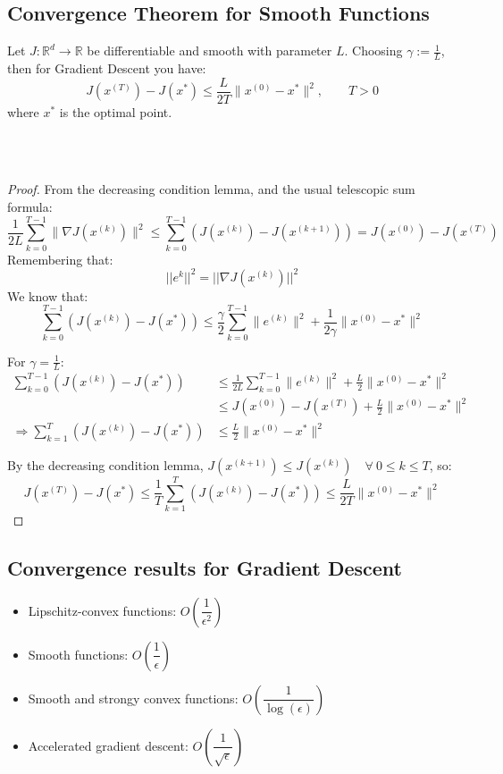 \subsection{Convergence Theorem for Smooth Functions}
\begin{theorem}
Let $J: \mathbb{R}^d \to \mathbb{R}$ be differentiable and smooth with parameter $L$.
Choosing $\gamma := \frac{1}{L}$, then for Gradient Descent you have:
\[
J(x^{(T)}) - J(x^*) \leq \frac{L}{2T}\|x^{(0)} - x^*\|^2, \quad \quad  T > 0
\]
where $x^*$ is the optimal point.
\end{theorem}
\\ \\
\begin{proof}
From the decreasing condition lemma, and the usual telescopic sum formula:
\[
\frac{1}{2L}\sum_{k=0}^{T-1}\|\nabla J(x^{(k)})\|^2 \leq \sum_{k=0}^{T-1}(J(x^{(k)}) - J(x^{(k+1)})) = J(x^{(0)}) - J(x^{(T)})
\]
Remembering that:
$$
|| e^{k} ||^2 = || \nabla J(x^{(k)}) ||^2
$$
We know that:
\[
\sum_{k=0}^{T-1}(J(x^{(k)}) - J(x^*)) \leq \frac{\gamma}{2}\sum_{k=0}^{T-1}\|e^{(k)}\|^2 + \frac{1}{2\gamma}\|x^{(0)} - x^*\|^2
\]

For $\gamma = \frac{1}{L}$:
\begin{align*}
\sum_{k=0}^{T-1}(J(x^{(k)}) - J(x^*)) &\leq \frac{1}{2L}\sum_{k=0}^{T-1}\|e^{(k)}\|^2 + \frac{L}{2}\|x^{(0)} - x^*\|^2 \\
&\leq J(x^{(0)}) - J(x^{(T)}) + \frac{L}{2}\|x^{(0)} - x^*\|^2 \\
\Rightarrow \sum_{k=1}^{T}(J(x^{(k)}) - J(x^*)) &\leq \frac{L}{2}\|x^{(0)} - x^*\|^2
\end{align*}

By the decreasing condition lemma, $J(x^{(k+1)}) \leq J(x^{(k)}) \quad \forall \ 0 \leq k \leq T$, so:
\[
J(x^{(T)}) - J(x^*) \leq \frac{1}{T}\sum_{k=1}^{T}(J(x^{(k)}) - J(x^*)) \leq \frac{L}{2T}\|x^{(0)} - x^*\|^2
\]
\end{proof}


\subsection*{Convergence results for Gradient Descent}
\begin{itemize}
    \item Lipschitz-convex functions: $O\left(\dfrac{1}{\epsilon^2}\right)$
    \item Smooth functions: $O\left(\dfrac{1}{\epsilon}\right)$
    \item Smooth and strongy convex functions: $O\left(\dfrac{1}{\log(\epsilon)}\right)$
    \item Accelerated gradient descent: $O\left(\dfrac{1}{\sqrt{\epsilon}}\right)$
\end{itemize}


